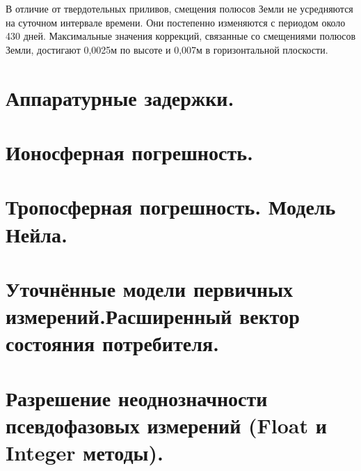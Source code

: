 \documentclass[14pt,a4paper,oneside]{extarticle}
\begin{document}
В отличие от твердотельных приливов, смещения полюсов Земли не усредняются на суточном интервале времени. 
Они постепенно изменяются с периодом около 430 дней. 
Максимальные значения коррекций, связанные со смещениями полюсов Земли, достигают 0,0025м по высоте и 0,007м в горизонтальной плоскости.


\section{Аппаратурные задержки.}
\section{Ионосферная погрешность.}
\section{Тропосферная погрешность. Модель Нейла.}
\section{Уточнённые модели первичных измерений.Расширенный вектор состояния потребителя.}
\section{Разрешение неоднозначности псевдофазовых измерений (Float и Integer методы).}
\end{document}
